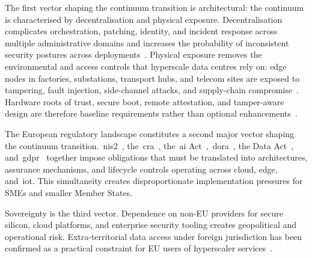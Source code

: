 \documentclass{ieeeaccess}
\begin{document}
The first vector shaping the continuum transition is architectural: the continuum is characterised by decentralisation and physical exposure. Decentralisation complicates orchestration, patching, identity, and incident response across multiple administrative domains and increases the probability of inconsistent security postures across deployments~\cite{roman2018,ranaweera2021}. Physical exposure removes the environmental and access controls that hyperscale data centres rely on: edge nodes in factories, substations, transport hubs, and telecom sites are exposed to tampering, fault injection, side-channel attacks, and supply-chain compromise~\cite{alwarafy2021}. Hardware roots of trust, secure boot, remote attestation, and tamper-aware design are therefore baseline requirements rather than optional enhancements~\cite{tpm2spec,sailer2004}.

The European regulatory landscape constitutes a second major vector shaping the continuum transition.~\gls{nis2}~\cite{eunis2}, the~\gls{cra}~\cite{eucra2024}, the~\gls{ai} Act~\cite{euaiact},~\gls{dora}~\cite{eudora}, the Data Act~\cite{eudataact}, and~\gls{gdpr}~\cite{eugdpr} together impose obligations that must be translated into architectures, assurance mechanisms, and lifecycle controls operating across cloud, edge, and~\gls{iot}. This simultaneity creates disproportionate implementation pressures for SMEs and smaller Member States.

Sovereignty is the third vector. Dependence on non-EU providers for secure silicon, cloud platforms, and enterprise security tooling creates geopolitical and operational risk. Extra-territorial data access under foreign jurisdiction has been confirmed as a practical constraint for EU users of hyperscaler services~\cite{microsoftsenat2025}.
\end{document}
